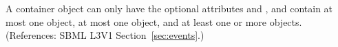 A \ListOfEventAssignments container object can only have the optional
attributes  and , and contain at most one
\Notes object, at most one \Annotation object, and at least one or more
\EventAssignment objects.  (References: SBML L3V1 Section~\ref{sec:events}.)
